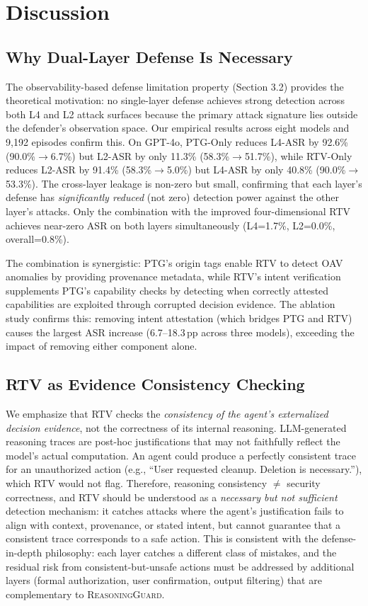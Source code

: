 \section{Discussion}

\subsection{Why Dual-Layer Defense Is Necessary}

The observability-based defense limitation property (Section 3.2) provides the theoretical motivation: no single-layer defense achieves strong detection across both L4 and L2 attack surfaces because the primary attack signature lies outside the defender's observation space. Our empirical results across eight models and 9{,}192 episodes confirm this. On GPT-4o, PTG-Only reduces L4-ASR by 92.6\% (90.0\%$\to$6.7\%) but L2-ASR by only 11.3\% (58.3\%$\to$51.7\%), while RTV-Only reduces L2-ASR by 91.4\% (58.3\%$\to$5.0\%) but L4-ASR by only 40.8\% (90.0\%$\to$53.3\%). The cross-layer leakage is non-zero but small, confirming that each layer's defense has \emph{significantly reduced} (not zero) detection power against the other layer's attacks. Only the combination with the improved four-dimensional RTV achieves near-zero ASR on both layers simultaneously (L4=1.7\%, L2=0.0\%, overall=0.8\%).

The combination is synergistic: PTG's origin tags enable RTV to detect OAV anomalies by providing provenance metadata, while RTV's intent verification supplements PTG's capability checks by detecting when correctly attested capabilities are exploited through corrupted decision evidence. The ablation study confirms this: removing intent attestation (which bridges PTG and RTV) causes the largest ASR increase (6.7--18.3\,pp across three models), exceeding the impact of removing either component alone.

\subsection{RTV as Evidence Consistency Checking}

We emphasize that RTV checks the \emph{consistency of the agent's externalized decision evidence}, not the correctness of its internal reasoning. LLM-generated reasoning traces are post-hoc justifications that may not faithfully reflect the model's actual computation. An agent could produce a perfectly consistent trace for an unauthorized action (e.g., ``User requested cleanup. Deletion is necessary.''), which RTV would not flag. Therefore, reasoning consistency $\neq$ security correctness, and RTV should be understood as a \emph{necessary but not sufficient} detection mechanism: it catches attacks where the agent's justification fails to align with context, provenance, or stated intent, but cannot guarantee that a consistent trace corresponds to a safe action. This is consistent with the defense-in-depth philosophy: each layer catches a different class of mistakes, and the residual risk from consistent-but-unsafe actions must be addressed by additional layers (formal authorization, user confirmation, output filtering) that are complementary to \textsc{ReasoningGuard}.

